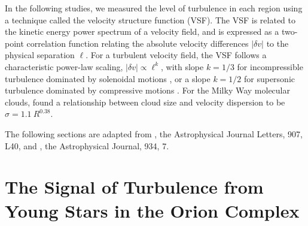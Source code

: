 In the following studies, we measured the level of turbulence in each region using a technique called the velocity structure function (VSF).
The VSF is related to the kinetic energy power spectrum of a velocity field, and is expressed as a two-point correlation function relating the absolute velocity differences $|\delta v|$ to the physical separation $\ell$. For a turbulent velocity field, the VSF follows a characteristic power-law scaling, $|\delta v| \propto \ell^k$, with slope $k = 1/3$ for incompressible turbulence dominated by solenoidal motions \citep[][]{kolmogorov_local_1941}, or a slope $k = 1/2$ for supersonic turbulence dominated by compressive motions \citep{burgers_mathematical_1995}. For the Milky Way molecular clouds, \citet{larson_turbulence_1981} found a relationship between cloud size and velocity dispersion to be $\sigma = 1.1~R^{0.38}$.

The following sections are adapted from \citet{ha_measuring_2021}, the Astrophysical Journal Letters, 907, L40, and \citet{ha_turbulence_2022}, the Astrophysical Journal, 934, 7.

\section{The Signal of Turbulence from Young Stars in the Orion Complex}

